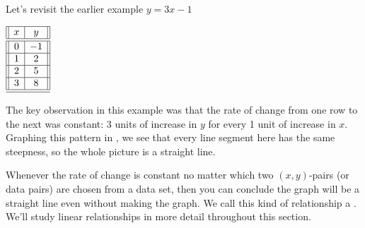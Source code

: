 \documentclass[nooutcomes]{ximera}
\begin{document}
Let's revisit the earlier example $y=3x-1$

\begin{center}
\(
\begin{array}{||c|c||}
\hline
x&y\\
\hline 
\hline
0&-1\\
\hline
1&2\\
\hline
2&5\\
\hline
3&8 \\
\hline 
\hline
\end{array}
\)
\end{center}


The key observation in this example was that the rate of change from one row to the next was constant: 3 units of increase in $y$ for every 1  unit of increase in $x$. Graphing this pattern in , we see that every line segment here has the same steepness, so the whole picture is a straight line.

\begin{image}
\end{image}

Whenever the rate of change is constant no matter which two $(x,y)$-pairs (or data pairs) are chosen from a data set, then you can conclude the graph will be a straight line even without making the graph. We call this kind of relationship a . We'll study linear relationships in more detail throughout this section.
\end{document}
